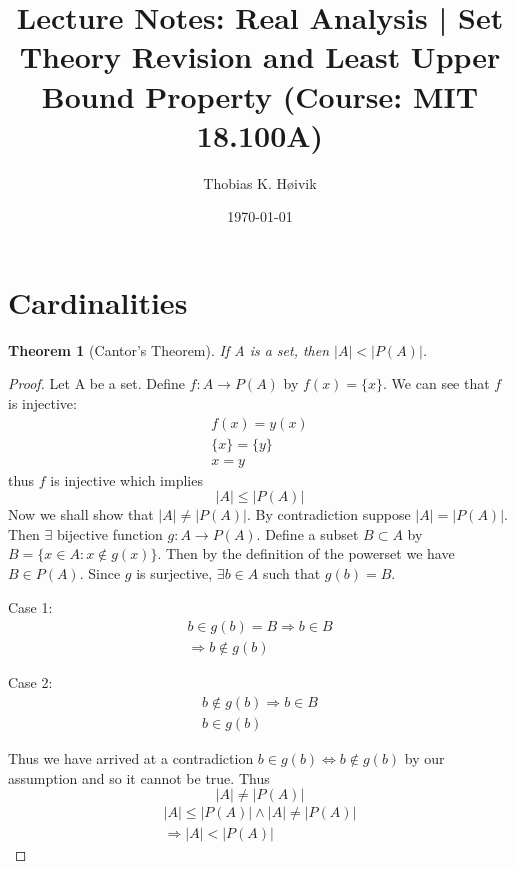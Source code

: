 \documentclass[12pt]{article}
\title{Lecture Notes: Real Analysis | Set Theory Revision and Least Upper Bound Property (Course: MIT 18.100A)}
\author{Thobias K. Høivik}
\date{\today}
\newtheorem{theorem}{Theorem}
\begin{document}
\maketitle
\section*{Cardinalities}
\begin{theorem}[Cantor's Theorem]
    If A is a set, then \(|A| < |P(A)|\).
\end{theorem}
\begin{proof}
    Let A be a set. Define \(f: A \to P(A)\) by \(f(x) = \{x\}\). 
    We can see that \(f\) is injective:
    \begin{gather*}
        f(x) = y(x) \\ 
        \{x\} = \{y\} \\ 
        x = y
    \end{gather*}
    thus \(f\) is injective which implies 
    \[ \boxed{|A| \leq |P(A)|}\] 
    Now we shall show that \(|A| \neq |P(A)|\). 
    By contradiction suppose \(|A| = |P(A)|\). 
    Then \(\exists\) bijective function \(g: A \to P(A)\). 
    Define a subset \(B \subset A\) by 
    \(B = \{x\in A : x \not\in g(x)\}\). 
    Then by the definition of the powerset we have 
    \(B \in P(A)\). Since \(g\) is surjective,  
    \(\exists b \in A\) such that \(g(b)=B\). 
    
    \noindent 
    Case 1: 
    \begin{gather*}
        b\in g(b) = B \Rightarrow b \in B \\ 
        \Rightarrow b \not\in g(b)
    \end{gather*}
    
    \noindent 
    Case 2: 
    \begin{gather*}
        b \not \in g(b) \Rightarrow b \in B \\ 
        b \in g(b)
    \end{gather*}

    \noindent
    Thus we have arrived at a contradiction 
    \(b \in g(b) \Leftrightarrow b \not \in g(b)\) 
    by our assumption and so it cannot be true. 
    Thus 
    \[ 
        \boxed{|A| \neq |P(A)|}
    \]
    \begin{gather*}
        |A| \leq |P(A)| \land |A| \neq |P(A)| \\
        \Rightarrow \boxed{|A| < |P(A)|}
    \end{gather*}
    
\end{proof}
\end{document}
